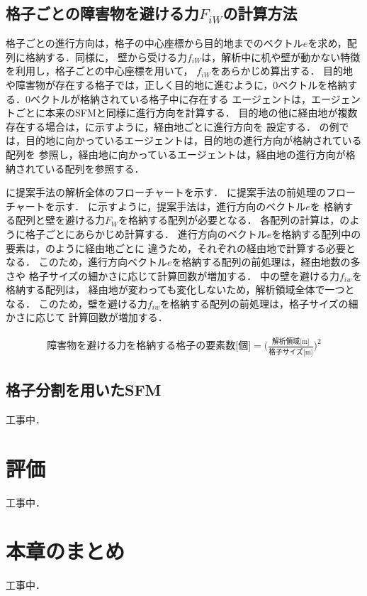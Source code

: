 \subsection{格子ごとの障害物を避ける力$F_{iW}$の計算方法}
格子ごとの進行方向は，格子の中心座標から目的地までのベクトル$e$を求め，配列に格納する．同様に，
壁から受ける力$f_{iW}$は，解析中に机や壁が動かない特徴を利用し，格子ごとの中心座標を用いて，
$f_{iW}$をあらかじめ算出する．
目的地や障害物が存在する格子では，正しく目的地に進むように，0ベクトルを格納する．0ベクトルが格納されている格子中に存在する
エージェントは，エージェントごとに本来のSFMと同様に進行方向を計算する．
目的地の他に経由地が複数存在する場合は，に示すように，経由地ごとに進行方向を
設定する．
の例では，目的地に向かっているエージェントは，目的地の進行方向が格納されている配列を
参照し，経由地に向かっているエージェントは，経由地の進行方向が格納されている配列を参照する．

に提案手法の解析全体のフローチャートを示す．
に提案手法の前処理のフローチャートを示す．
に示すように，提案手法は，進行方向のベクトル$e$を
格納する配列と壁を避ける力$F_W$を格納する配列が必要となる．
各配列の計算は，のように格子ごとにあらかじめ計算する．
進行方向のベクトル$e$を格納する配列中の要素は，のように経由地ごとに
違うため，それぞれの経由地で計算する必要となる．
このため，進行方向ベクトル$e$を格納する配列の前処理は，経由地数の多さや
格子サイズの細かさに応じて計算回数が増加する．
中の壁を避ける力$f_{iw}$を格納する配列は，
経由地が変わっても変化しないため，解析領域全体で一つとなる．
このため，壁を避ける力$f_{iw}$を格納する配列の前処理は，格子サイズの細かさに応じて
計算回数が増加する．



\begin{eqnarray}
 \mbox{障害物を避ける力を格納する格子の要素数[個]} =  \Big( \frac{\mbox{解析領域[m]}}{\mbox{格子サイズ[m]}} \Big) ^ 2
 \label{eq:fiw_youso_size}
\end{eqnarray}

\subsection{格子分割を用いたSFM}
工事中．

\section{評価}
工事中．

\section{本章のまとめ}
工事中．

